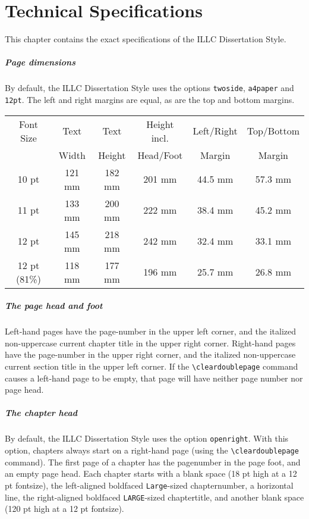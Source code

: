 \chapter{Technical Specifications}
This chapter contains the exact specifications of the ILLC Dissertation Style.

\paragraph*{Page dimensions}
By default, the ILLC Dissertation Style uses the options
\verb|twoside|, \verb|a4paper| and \verb|12pt|.
The left and right margins are equal, as are the top and bottom margins.
\\[\baselineskip]
\begin{tabular}{|c|c|c|c|c|c|}\hline
Font Size &  Text   &  Text   & Height incl.& Left/Right & Top/Bottom \\
          &  Width  &  Height &  Head/Foot  &   Margin   & Margin     \\ \hline
 10 pt    &  121 mm &  182 mm &  201 mm     &  44.5 mm   &  57.3 mm   \\
 11 pt    &  133 mm &  200 mm &  222 mm     &  38.4 mm   &  45.2 mm   \\
 12 pt    &  145 mm &  218 mm &  242 mm     &  32.4 mm   &  33.1 mm   \\
12 pt (81\%)& 118 mm & 177 mm &  196 mm     &  25.7 mm   &  26.8 mm   \\ \hline
\end{tabular}

\paragraph*{The page head and foot}
Left-hand pages have the page-number in the upper left corner,
and the italized non-uppercase current chapter title in the upper right corner.
Right-hand pages have the page-number in the upper right corner,
and the italized non-uppercase current section title in the upper left corner.
If the \verb|\cleardoublepage| command causes a left-hand page to be empty,
that page will have neither page number nor page head.

\paragraph*{The chapter head}
By default, the ILLC Dissertation Style uses the option \verb|openright|.
With this option, chapters always start on a right-hand page
(using the \verb|\cleardoublepage| command).
The first page of a chapter has the pagenumber in the page foot,
and an empty page head.
Each chapter starts with
a blank space (18 pt high at a 12 pt fontsize),
the left-aligned boldfaced \verb|Large|-sized chapternumber,
a horizontal line,
the right-aligned boldfaced \verb|LARGE|-sized chaptertitle,
and another blank space (120 pt high at a 12 pt fontsize).

